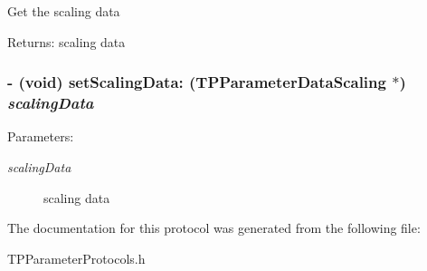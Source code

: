 Get the scaling data \begin{Desc}
\item[Returns:]scaling data \end{Desc}
\hypertarget{protocol_t_p_chart_data_scaling-p_940844c4e44e6f253f1b9b389646793d}{
\subsubsection[{setScalingData:}]{\setlength{\rightskip}{0pt plus 5cm}- (void) setScalingData: ({\bf TPParameterDataScaling} $\ast$) {\em scalingData}}}
\label{protocol_t_p_chart_data_scaling-p_940844c4e44e6f253f1b9b389646793d}


\begin{Desc}
\item[Parameters:]
\begin{description}
\item[{\em scalingData}]scaling data \end{description}
\end{Desc}


The documentation for this protocol was generated from the following file:\begin{CompactItemize}
\item 
TPParameterProtocols.h\end{CompactItemize}
